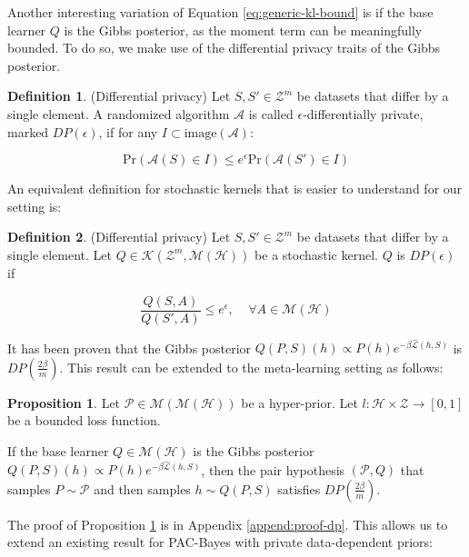 \documentclass{article}
\theoremstyle{definition}
\newtheorem{defn}{Definition}[section]
\newtheorem{proposition}[theorem]{Proposition}
\begin{document}
Another interesting variation of Equation \ref{eq:generic-kl-bound} is if the base learner $Q$ is the Gibbs posterior, as the moment term can be meaningfully bounded. To do so, we make use of the differential privacy traits of the Gibbs posterior.

\begin{defn} (Differential privacy)
	Let $S,S'\in \mathcal{Z}^m$ be datasets that differ by a single element.
	A randomized algorithm $\mathcal{A}$ is called  $\epsilon$-differentially private, marked $DP(\epsilon)$, if for any $I\subset \mathrm{image}(\mathcal{A})$:
	
	$$\mathrm{Pr}(\mathcal{A}(S)\in I)\leq e^\epsilon \mathrm{Pr}(\mathcal{A}(S')\in I)$$
\end{defn}

An equivalent definition for stochastic kernels that is easier to understand for our setting is:

\begin{defn} (Differential privacy)
	Let $S,S'\in \mathcal{Z}^m$ be datasets that differ by a single element.
	Let $Q\in \mathcal{K}(\mathcal{Z}^m, \mathcal{M}(\mathcal{H}))$ be a stochastic kernel.
	$Q$ is $DP(\epsilon)$ if 
	
	$$\frac{Q(S, A)}{Q(S', A)} \leq e^\epsilon, \;\;\;\; \forall A\in  \mathcal{M}(\mathcal{H})$$
\end{defn}

It has been proven \citep{McSherry2007, Rivasplata2020} that the Gibbs posterior $Q(P, S)(h)\propto P(h)e^{-\beta\hat{\mathcal{L}}(h, S)}$ is $DP\left (\frac{2\beta}{m}\right )$.
This result can be extended to the meta-learning setting as follows:

\begin{proposition} \label{thm:pair-is-dp}
	Let $\mathcal{P}\in \mathcal{M}(\mathcal{M}(\mathcal{H}))$ be a hyper-prior.
	Let $l:\mathcal{H}\times \mathcal{Z}\rightarrow [0,1]$ be a bounded loss function.
	
	If the base learner $Q\in \mathcal{M}(\mathcal{H})$ is the Gibbs posterior $Q(P, S)(h)\propto P(h)e^{-\beta\hat{\mathcal{L}}(h, S)}$, 
	then the pair hypothesis $(\mathcal{P}, Q)$ that samples $P\sim\mathcal{P}$ and then samples $h\sim Q(P, S)$ satisfies $DP\left (\frac{2\beta}{m}\right )$.
\end{proposition}

The proof of Proposition \ref{thm:pair-is-dp} is in Appendix \ref{append:proof-dp}. This  allows us to extend an existing result for PAC-Bayes with private data-dependent priors:
\end{document}
